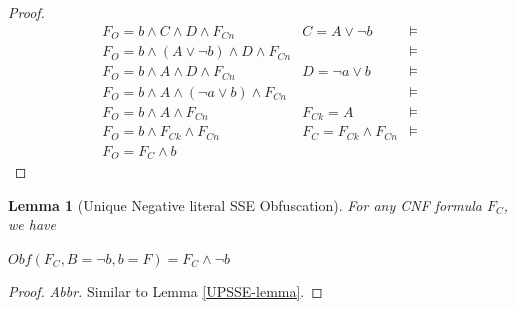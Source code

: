 \documentclass[conference]{IEEEtran}
\newtheorem{lemma}{\textbf{Lemma}}
\begin{document}
\begin{proof}
\begin{equation}
\begin{array}{ccc}
F_O  =  b\wedge C\wedge D\wedge F_{Cn}                  &C=A\vee \neg b~           &\models\\
F_O  =  b\wedge (A\vee \neg b) \wedge D\wedge F_{Cn}    &                          &\models\\
F_O  =  b\wedge A \wedge D\wedge F_{Cn}                 & D=\neg a\vee b~          &\models\\
F_O  =  b\wedge A \wedge (\neg a\vee b)\wedge F_{Cn}    &                          &\models\\
F_O  =  b\wedge A \wedge F_{Cn}                         &F_{Ck} =A                 &\models\\
F_O  =  b\wedge F_{Ck}\wedge F_{Cn}                     & F_C=F_{Ck} \wedge F_{Cn} &\models\\
F_O  =  F_C \wedge b                                    &   &
\end{array}
\end{equation}
\end{proof}

\begin{lemma}[Unique Negative literal SSE Obfuscation]\label{UNSSE-lemma}
For any CNF formula $F_C$, we have

 \textbf{$Obf(F_C,B=\neg b,{b=F})=F_C\wedge \neg b$}
\end{lemma}
\begin{proof}
 \textsl{Abbr.}
  Similar to Lemma \ref{UPSSE-lemma}.
\end{proof}
% 
\end{document}
